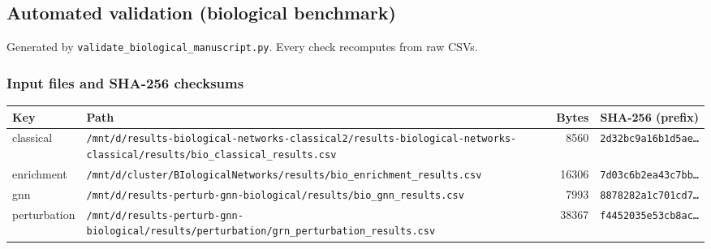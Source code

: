 \subsection{Automated validation (biological benchmark)}
Generated by \texttt{validate\_biological\_manuscript.py}. Every check recomputes from raw CSVs.
\subsubsection{Input files and SHA-256 checksums}
\footnotesize
\begin{tabular}{lp{8cm}rr}
\toprule
\textbf{Key} & \textbf{Path} & \textbf{Bytes} & \textbf{SHA-256 (prefix)} \\
\midrule
classical & \texttt{/mnt/d/results-biological-networks-classical2/results-biological-networks-classical/results/bio\_classical\_results.csv} & 8560 & \texttt{2d32bc9a16b1d5ae\ldots} \\
enrichment & \texttt{/mnt/d/cluster/BIologicalNetworks/results/bio\_enrichment\_results.csv} & 16306 & \texttt{7d03c6b2ea43c7bb\ldots} \\
gnn & \texttt{/mnt/d/results-perturb-gnn-biological/results/bio\_gnn\_results.csv} & 7993 & \texttt{8878282a1c701cd7\ldots} \\
perturbation & \texttt{/mnt/d/results-perturb-gnn-biological/results/perturbation/grn\_perturbation\_results.csv} & 38367 & \texttt{f4452035e53cb8ac\ldots} \\
\bottomrule
\end{tabular}
\normalsize
